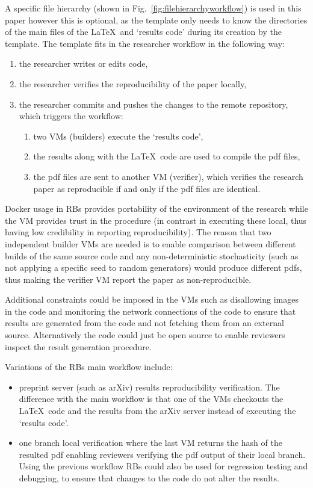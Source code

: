 \documentclass[journal]{IEEEtran}
\begin{document}
A specific file hierarchy (shown in Fig.~\ref{fig:filehierarchyworkflow}) is used in this paper however this is optional, as the template only needs to know the directories of the main files of the \LaTeX\ and `results code' during its creation by the template.
The template fits in the researcher workflow in the following way:
\begin{enumerate}
	\item the researcher writes or edits code,
	\item the researcher verifies the reproducibility of the paper locally,
	\item the researcher commits and pushes the changes to the remote repository, which triggers the workflow:
		\begin{enumerate}
			\item two VMs (builders) execute the `results code',
			\item the results along with the \LaTeX\ code are used to compile the pdf files,
			\item the pdf files are sent to another VM (verifier), which verifies the research paper as reproducible if and only if the pdf files are identical.
		\end{enumerate}
\end{enumerate}

Docker usage in RBs provides portability of the environment of the research while the VM provides trust in the procedure (in contrast in executing these local, thus having low credibility in reporting reproducibility).
The reason that two independent builder VMs are needed is to enable comparison between different builds of the same source code and any non-deterministic stochasticity (such as not applying a specific seed to random generators) would produce different pdfs, thus making the verifier VM report the paper as non-reproducible.

Additional constraints could be imposed in the VMs such as disallowing images in the code and monitoring the network connections of the code to ensure that results are generated from the code and not fetching them from an external source.
Alternatively the code could just be open source to enable reviewers inspect the result generation procedure.

Variations of the RBs main workflow include:
\begin{itemize}
	\item preprint server (such as arXiv) results reproducibility verification.
		The difference with the main workflow is that one of the VMs checkouts the \LaTeX\ code and the results from the arXiv server instead of executing the `results code'.
	\item one branch local verification where the last VM returns the hash of the resulted pdf enabling reviewers verifying the pdf output of their local branch.
		Using the previous workflow RBs could also be used for regression testing and debugging, to ensure that changes to the code do not alter the results.
\end{itemize}
\end{document}
